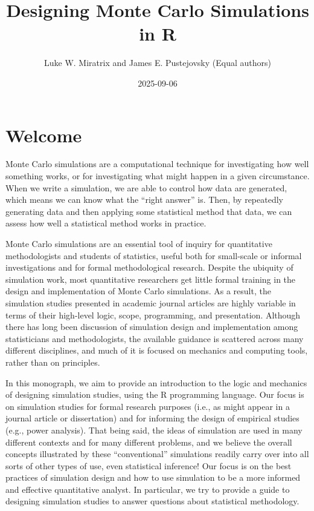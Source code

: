 \documentclass[
]{book}
\title{Designing Monte Carlo Simulations in R}
\author{Luke W. Miratrix and James E. Pustejovsky
(Equal authors)}
\date{2025-09-06}
\begin{document}
\maketitle

{
\setcounter{tocdepth}{1}
\tableofcontents
}
\chapter*{Welcome}\label{welcome}

Monte Carlo simulations are a computational technique for investigating how well something works, or for investigating what might happen in a given circumstance.
When we write a simulation, we are able to control how data are generated, which means we can know what the ``right answer'' is.
Then, by repeatedly generating data and then applying some statistical method that data, we can assess how well a statistical method works in practice.

Monte Carlo simulations are an essential tool of inquiry for quantitative methodologists and students of statistics, useful both for small-scale or informal investigations and for formal methodological research.
Despite the ubiquity of simulation work, most quantitative researchers get little formal training in the design and implementation of Monte Carlo simulations. As a result, the simulation studies presented in academic journal articles are highly variable in terms of their high-level logic, scope, programming, and presentation.
Although there has long been discussion of simulation design and implementation among statisticians and methodologists, the available guidance is scattered across many different disciplines, and much of it is focused on mechanics and computing tools, rather than on principles.

In this monograph, we aim to provide an introduction to the logic and mechanics of designing simulation studies, using the R programming language.
Our focus is on simulation studies for formal research purposes (i.e., as might appear in a journal article or dissertation) and for informing the design of empirical studies (e.g., power analysis).
That being said, the ideas of simulation are used in many different contexts and for many different problems, and we believe the overall concepts illustrated by these ``conventional'' simulations readily carry over into all sorts of other types of use, even statistical inference!
Our focus is on the best practices of simulation design and how to use simulation to be a more informed and effective quantitative analyst.
In particular, we try to provide a guide to designing simulation studies to answer questions about statistical methodology.
\end{document}
